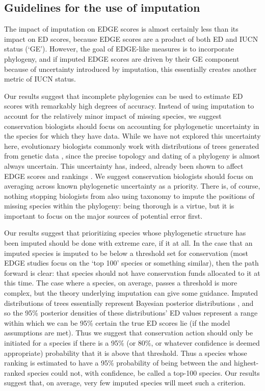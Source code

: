 \documentclass[12pt,english]{article}
\begin{document}
\subsection*{Guidelines for the use of imputation}
The impact of imputation on EDGE scores is almost certainly less than its impact
on ED scores, because EDGE scores are a product of both ED and IUCN status
(‘GE'). However, the goal of EDGE-like measures is to incorporate phylogeny, and
if imputed EDGE scores are driven by their GE component because of uncertainty
introduced by imputation, this essentially creates another metric of IUCN
status.

Our results suggest that incomplete phylogenies can be used to estimate ED
scores with remarkably high degrees of accuracy. Instead of using imputation to
account for the relatively minor impact of missing species, we suggest
conservation biologists should focus on accounting for phylogenetic uncertainty
in the species for which they have data. While we have not explored this
uncertainty here, evolutionary biologists commonly work with distributions of
trees generated from genetic data \autocite[reviewed in][]{Huelsenbeck2001,
Bollback2005}, since the precise topology and dating of a phylogeny is almost
always uncertain. This uncertainty has, indeed, already been shown to affect
EDGE scores and rankings \autocite{Pearse2015}. We suggest conservation
biologists should focus on averaging across known phylogenetic uncertainty as a
priority. There is, of course, nothing stopping biologists from also using
taxonomy to impute the positions of missing species within the phylogeny: being
thorough is a virtue, but it is important to focus on the major sources of
potential error first.

Our results suggest that prioritizing species whose phylogenetic structure has
been imputed should be done with extreme care, if it at all. In the case that an
imputed species is imputed to be below a threshold set for conservation (most
EDGE studies focus on the ‘top 100' species or something similar), then the path
forward is clear: that species should not have conservation funds allocated to
it at this time. The case where a species, on average, passes a threshold is
more complex, but the theory underlying imputation can give some guidance.
Imputed distributions of trees essentially represent Bayesian posterior
distributions \autocite{Kuhn2011}, and so the 95\% posterior densities of these
distributions' ED values represent a range within which we can be 95\% certain
the true ED scores lie (if the model assumptions are met). Thus we suggest that
conservation action should only be initiated for a species if there is a 95\%
(or 80\%, or whatever confidence is deemed appropriate) probability that it is
above that threshold. Thus a species whose ranking is estimated to have a 95\%
probability of being between the  and  highest-ranked species
could not, with confidence, be called a top-100 species. Our results suggest
that, on average, very few imputed species will meet such a criterion.
\end{document}
